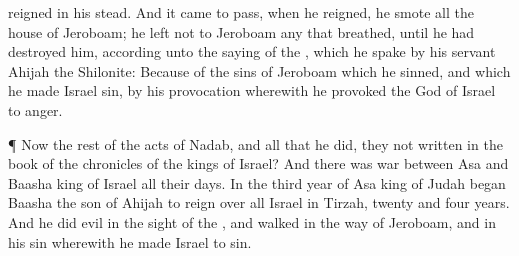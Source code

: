 {reigned in his stead.
And it came to pass, when he
reigned,
{} he
smote all the
house of
Jeroboam; he
left not to
Jeroboam any that
breathed, until he had
destroyed him, according unto the
saying of the
{}, which he
spake
by his
servant
Ahijah the
Shilonite:
Because of the
sins of
Jeroboam which he
sinned, and which he made
Israel
sin, by his
provocation wherewith he provoked the
{}
God of
Israel to
anger.
\par }{\PP {}¶ Now the
rest of the
acts of
Nadab, and all that he
did,
{} they not
written in the
book of the
chronicles of the
kings of
Israel?
And there was
war between
Asa and
Baasha
king of
Israel all their
days.
In the
third
year of
Asa
king of
Judah began
Baasha the
son of
Ahijah to
reign over all
Israel in
Tirzah,
twenty and
four
years.
And he
did
evil in the
sight of the
{}, and
walked in the
way of
Jeroboam, and in his
sin wherewith he made
Israel to
sin.

}
